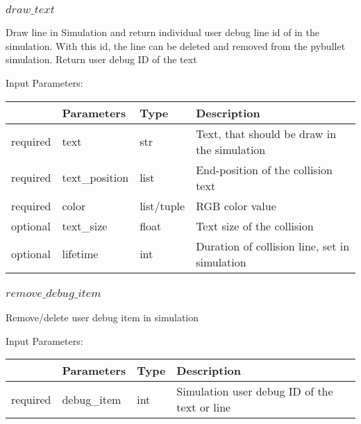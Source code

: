 \documentclass[
	ngerman,
	accentcolor=9c,%
	type=intern,
	marginpar=false
	]{tudapub}
\begin{document}
\subsubsection{$draw\_text$}
\noindent Draw line in Simulation and return individual user debug line id of in the simulation.
    With this id, the line can be deleted and removed from the pybullet simulation. Return user debug ID of the text



\vspace{0.5cm}
\noindent Input Parameters:
\vspace{0.5cm}

\begin{tabular}{|p{}|p{}|p{}| p{}|}
\hline
 & \textbf{Parameters} & \textbf{Type} & \textbf{Description} \\
\hline
required & text & str & Text, that should be draw in the simulation\\
\hline
required & text\_position & list & End-position of the collision text\\
\hline
required & color & list/tuple & RGB color value\\
\hline
optional & text\_size & float & Text size of the collision\\
\hline
optional & lifetime & int & Duration of collision line, set in simulation\\
\hline
\end{tabular}
\vspace{0.5cm}



\subsubsection{$remove\_debug\_item$}
\noindent  Remove/delete user debug item in simulation



\vspace{0.5cm}
\noindent Input Parameters:
\vspace{0.5cm}

\begin{tabular}{|p{}|p{}|p{}| p{}|}
\hline
 & \textbf{Parameters} & \textbf{Type} & \textbf{Description} \\
\hline
required & debug\_item & int  & Simulation user debug ID of the text or line\\
\hline
\end{tabular}
\vspace{0.5cm}
\end{document}
